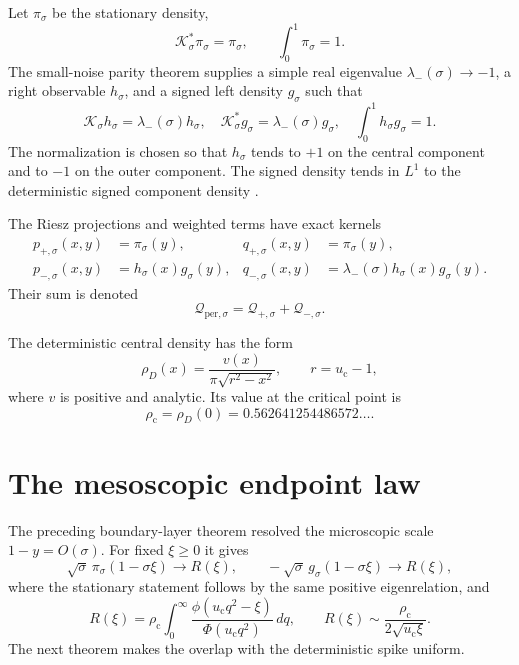 \documentclass[11pt]{article}
\theoremstyle{remark}
\newcommand{\cK}{\mathcal K}
\newcommand{\cQ}{\mathcal Q}
\newcommand{\uc}{u_{\mathrm c}}
\newcommand{\rhop}{\rho_{\mathrm c}}
\newcommand{\Qper}{\cQ_{\mathrm{per},\sigma}}
\begin{document}
Let $\pi_\sigma$ be the stationary density,
\begin{equation}
 \cK_\sigma^*\pi_\sigma=\pi_\sigma,
 \qquad
 \int_0^1\pi_\sigma=1.
 \label{eq:stationary}
\end{equation}
The small-noise parity theorem supplies a simple real eigenvalue
$\lambda_-(\sigma)\to-1$, a right observable $h_\sigma$, and a signed left
density $g_\sigma$ such that
\begin{equation}
 \cK_\sigma h_\sigma=\lambda_-(\sigma)h_\sigma,
 \quad
 \cK_\sigma^*g_\sigma=\lambda_-(\sigma)g_\sigma,
 \quad
 \int_0^1h_\sigma g_\sigma=1.
 \label{eq:parity-factors}
\end{equation}
The normalization is chosen so that $h_\sigma$ tends to $+1$ on the central
component and to $-1$ on the outer component.  The signed density tends in
$L^1$ to the deterministic signed component density
\citep{WangBoundaryLayer2026}.

The Riesz projections and weighted terms have exact kernels
\begin{align}
 p_{+,\sigma}(x,y)&=\pi_\sigma(y),
 &q_{+,\sigma}(x,y)&=\pi_\sigma(y),
 \label{eq:perron-kernel}\\
 p_{-,\sigma}(x,y)&=h_\sigma(x)g_\sigma(y),
 &q_{-,\sigma}(x,y)&=\lambda_-(\sigma)h_\sigma(x)g_\sigma(y).
 \label{eq:parity-kernel}
\end{align}
Their sum is denoted
\begin{equation}
 \Qper=\cQ_{+,\sigma}+\cQ_{-,\sigma}.
 \label{eq:qper}
\end{equation}

The deterministic central density has the form
\begin{equation}
 \rho_D(x)=\frac{v(x)}{\pi\sqrt{r^2-x^2}},
 \qquad r=\uc-1,
 \label{eq:central-density}
\end{equation}
where $v$ is positive and analytic.  Its value at the critical point is
\begin{equation}
 \rhop=\rho_D(0)=0.562641254486572\ldots.
 \label{eq:rho-c}
\end{equation}

\section{The mesoscopic endpoint law}
\label{sec:mesoscopic}

The preceding boundary-layer theorem resolved the microscopic scale
$1-y=O(\sigma)$.  For fixed $\xi\ge0$ it gives
\begin{equation}
 \sqrt\sigma\,\pi_\sigma(1-\sigma\xi)\longrightarrow R(\xi),
 \qquad
 -\sqrt\sigma\,g_\sigma(1-\sigma\xi)\longrightarrow R(\xi),
 \label{eq:microscopic-profile}
\end{equation}
where the stationary statement follows by the same positive eigenrelation,
and
\begin{equation}
 R(\xi)=\rhop\int_0^\infty
 \frac{\phi(\uc q^2-\xi)}{\Phi(\uc q^2)}\,dq,
 \qquad
 R(\xi)\sim\frac{\rhop}{2\sqrt{\uc\xi}}.
 \label{eq:R-profile}
\end{equation}
The next theorem makes the overlap with the deterministic spike uniform.
\end{document}
